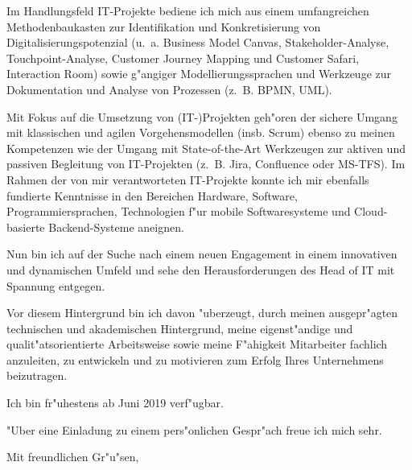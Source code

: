 \documentclass[10pt,a4paper]{dinbrief}
\begin{document}
\begin{letter}
Im Handlungsfeld IT-Projekte bediene ich mich aus einem umfangreichen Methodenbaukasten zur Identifikation und Konkretisierung von Digitalisierungspotenzial (u.~a. Business Model Canvas, Stakeholder-Analyse, Touchpoint-Analyse, Customer Journey Mapping und Customer Safari, Interaction Room) sowie g"angiger Modellierungssprachen und Werkzeuge zur Dokumentation und Analyse von Prozessen (z.~B. BPMN, UML).\clearpage

Mit Fokus auf die Umsetzung von (IT-)Projekten geh"oren der sichere Umgang mit klassischen und agilen Vorgehensmodellen (insb. Scrum) ebenso zu meinen Kompetenzen wie der Umgang mit State-of-the-Art Werkzeugen zur aktiven und passiven Begleitung von IT-Projekten (z.~B. Jira, Confluence oder MS-TFS). Im Rahmen der von mir verantworteten IT-Projekte konnte ich mir ebenfalls fundierte Kenntnisse in den Bereichen Hardware, Software, Programmiersprachen, Technologien f"ur mobile Softwaresysteme und Cloud-basierte Backend-Systeme aneignen.

Nun bin ich auf der Suche nach einem neuen Engagement in einem innovativen und dynamischen Umfeld und sehe den Herausforderungen des Head of IT mit Spannung entgegen.

Vor diesem Hintergrund bin ich davon "uberzeugt, durch meinen ausgepr"agten technischen und akademischen Hintergrund, meine eigenst"andige und qualit"atsorientierte Arbeitsweise sowie meine F"ahigkeit Mitarbeiter fachlich anzuleiten, zu entwickeln und zu motivieren zum Erfolg Ihres Unternehmens beizutragen.

Ich bin fr"uhestens ab Juni 2019 verf"ugbar. %

"Uber eine Einladung zu einem pers"onlichen Gespr"ach freue ich mich sehr.

\closing{Mit freundlichen Gr"u"sen,}
\end{letter}
\end{document}
